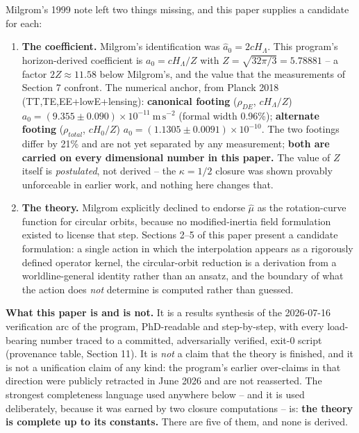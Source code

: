 \documentclass[
]{article}
\newcounter{none} %
\begin{document}
Milgrom's 1999 note left two things missing, and this paper supplies a
candidate for each:

\begin{enumerate}
\def\labelenumi{\arabic{enumi}.}
\item
  \textbf{The coefficient.} Milgrom's identification was
  \(\hat a_0 = 2cH_\Lambda\). This program's horizon-derived coefficient
  is \(a_0 = cH_\Lambda/Z\) with \(Z = \sqrt{32\pi/3} = 5.78881\) -- a
  factor \(2Z \approx 11.58\) below Milgrom's, and the value that the
  measurements of Section 7 confront. The numerical anchor, from Planck
  2018 (TT,TE,EE+lowE+lensing): \textbf{canonical footing}
  (\(\rho_{DE}\), \(cH_\Lambda/Z\))
  \(a_0 = (9.355 \pm 0.090)\times 10^{-11}\ \mathrm{m\,s^{-2}}\) (formal
  width 0.96\%); \textbf{alternate footing} (\(\rho_{total}\),
  \(cH_0/Z\)) \(a_0 = (1.1305 \pm 0.0091)\times 10^{-10}\). The two
  footings differ by 21\% and are not yet separated by any measurement;
  \textbf{both are carried on every dimensional number in this paper.}
  The value of \(Z\) itself is \emph{postulated}, not derived -- the
  \(\kappa = 1/2\) closure was shown provably unforceable in earlier
  work, and nothing here changes that.
\item
  \textbf{The theory.} Milgrom explicitly declined to endorse
  \(\hat\mu\) as the rotation-curve function for circular orbits,
  because no modified-inertia field formulation existed to license that
  step. Sections 2--5 of this paper present a candidate formulation: a
  single action in which the interpolation appears as a rigorously
  defined operator kernel, the circular-orbit reduction is a derivation
  from a worldline-general identity rather than an ansatz, and the
  boundary of what the action does \emph{not} determine is computed
  rather than guessed.
\end{enumerate}

\textbf{What this paper is and is not.} It is a results synthesis of the
2026-07-16 verification arc of the program, PhD-readable and
step-by-step, with every load-bearing number traced to a committed,
adversarially verified, exit-0 script (provenance table, Section 11). It
is \emph{not} a claim that the theory is finished, and it is not a
unification claim of any kind: the program's earlier over-claims in that
direction were publicly retracted in June 2026 and are not reasserted.
The strongest completeness language used anywhere below -- and it is
used deliberately, because it was earned by two closure computations --
is: \textbf{the theory is complete up to its constants.} There are five
of them, and none is derived.
\end{document}
